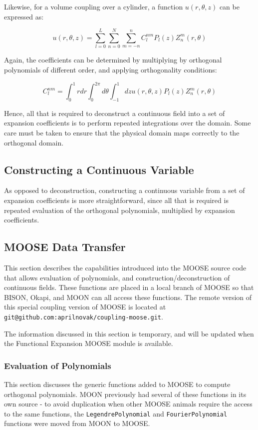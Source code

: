 \documentclass[10pt]{article}
\newcommand{\beq}{\begin{equation}}
\newcommand{\eeq}{\end{equation}}
\numberwithin{equation}{section} %
\begin{document}
Likewise, for a volume coupling over a cylinder, a function \(u(r,\theta,z)\) can be expressed as:

\beq
\label{eq:ZLReconstruction}
u(r,\theta,z)=\sum_{l=0}^{L}\sum_{n=0}^N\sum_{m=-n}^{n}C_{l}^{nm}P_l(z)Z_n^m(r,\theta)
\eeq

Again, the coefficients can be determined by multiplying by orthogonal polynomials of different order, and applying orthogonality conditions:

\beq
\label{eq:ZernikeLegendreCoefficient}
C_l^{nm}=\int_0^1rdr\int_{0}^{2\pi}d\theta\int_{-1}^{1}dzu(r,\theta,z)P_l(z)Z_n^m(r,\theta)
\eeq

Hence, all that is required to deconstruct a continuous field into a set of expansion coefficients is to perform repeated integrations over the domain. Some care must be taken to ensure that the physical domain maps correctly to the orthogonal domain.

\subsection{Constructing a Continuous Variable}
As opposed to deconstruction, constructing a continuous variable from a set of expansion coefficients is more straightforward, since all that is required is repeated evaluation of the orthogonal polynomials, multiplied by expansion coefficients.

\subsection{MOOSE Data Transfer}
This section describes the capabilities introduced into the MOOSE source code that allows evaluation of polynomials, and construction/deconstruction of continuous fields. These functions are placed in a local branch of MOOSE so that BISON, Okapi, and MOON can all access these functions. The remote version of this special coupling version of MOOSE is located at {\tt git@github.com:aprilnovak/coupling-moose.git}. 

\color{magenta}
The information discussed in this section is temporary, and will be updated when the Functional Expansion MOOSE module is available.
\color{black}

\subsubsection{Evaluation of Polynomials}
This section discusses the generic functions added to MOOSE to compute orthogonal polynomials. MOON previously had several of these functions in its own source - to avoid duplication when other MOOSE animals require the access to the same functions, the {\tt LegendrePolynomial} and {\tt FourierPolynomial} functions were moved from MOON to MOOSE.
\end{document}
